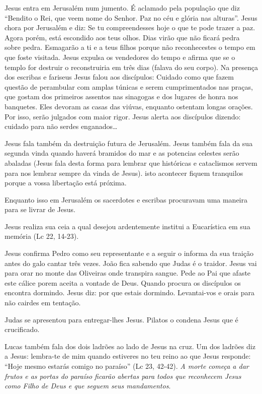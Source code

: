 \documentclass[
]{book}
\begin{document}
Jesus entra em Jerusalém num jumento. É aclamado pela população que diz ``Bendito o Rei, que veem nome do Senhor. Paz no céu e glória nas alturas''. Jesus chora por Jerusalém e diz: Se tu compreendesses hoje o que te pode trazer a paz. Agora porém, está escondido aos teus olhos. Dias virão que não ficará pedra sobre pedra. Esmagarão a ti e a teus filhos porque não reconhecestes o tempo em que foste visitada. Jesus expulsa os vendedores do tempo e afirma que se o templo for destruir o reconstruiria em três dias (falava do seu corpo). Na presença dos escribas e fariseus Jesus falou aos discípulos: Cuidado como que fazem questão de perambular com amplas túnicas e serem cumprimentados nas praças, que gostam dos primeiros assentos nas sinagogas e dos lugares de honra nos banquetes. Eles devoram as casas das viúvas, enquanto ostentam longas orações. Por isso, serão julgados com maior rigor. Jesus alerta aos discípulos dizendo: cuidado para não serdes enganados\ldots{}

Jesus fala também da destruição futura de Jerusalém. Jesus também fala da sua segunda vinda quando haverá bramidos do mar e as potencias celestes serão abaladas (Jesus fala desta forma para lembrar que históricas e cataclismos servem para nos lembrar sempre da vinda de Jesus). isto acontecer fiquem tranquilos porque a vossa libertação está próxima.

Enquanto isso em Jerusalém os sacerdotes e escribas procuravam uma maneira para se livrar de Jesus.

Jesus realiza sua ceia a qual desejou ardentemente institui a Eucarística em sua memória (Lc 22, 14-23).

Jesus confirma Pedro como seu representante e a seguir o informa da sua traição antes do galo cantar três vezes. João fica sabendo que Judas é o traidor. Jesus vai para orar no monte das Oliveiras onde transpira sangue. Pede ao Pai que afaste este cálice porem aceita a vontade de Deus. Quando procura os discípulos os encontra dormindo. Jesus diz: por que estais dormindo. Levantai-vos e orais para não cairdes em tentação.

Judas se apresentou para entregar-lhes Jesus. Pilatos o condena Jesus que é crucificado.

Lucas também fala dos dois ladrões ao lado de Jesus na cruz. Um dos ladrões diz a Jesus: lembra-te de mim quando estiveres no teu reino ao que Jesus responde: ``Hoje mesmo estarás comigo no paraíso'' (Lc 23, 42-42). \emph{A morte começa a dar frutos e as portas do paraíso ficarão abertas para todos que reconhecem Jesus como Filho de Deus e que seguem seus mandamentos}.
\end{document}

